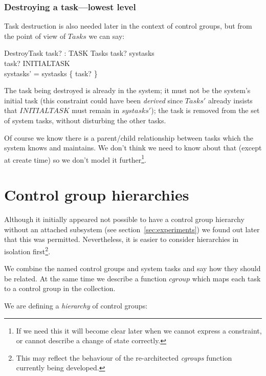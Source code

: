 \documentclass[a4paper,twoside,12pt]{article}
\begin{document}
\subsubsection{Destroying a task---lowest level}

Task destruction is also needed later in the context of control groups, but from the point of view of $Tasks$ we can say:

\begin{schema}{DestroyTask}
task? : TASK
\also
\Delta Tasks
\where
task? \in systasks \\
task? \neq INITIALTASK \\
systasks'  = systasks \setminus \{ task? \}
\end{schema}
The task being destroyed is already in the system; it must not be the system's initial task
(this constraint could have been \emph{derived} since $Tasks'$ already insists that $INITIALTASK$
must remain in $systasks'$);
the task is removed from the set of system tasks, without disturbing the other tasks.

Of course we know there is a parent/child relationship between tasks which the system knows and maintains.
We don't think we need to know about that (except at create time) so we don't model
it further\footnote{If we need this it will become clear later when we cannot express a constraint,
or cannot describe a change of state correctly.}.

\section{Control group hierarchies}
\label{sec:cgh}

Although it initially appeared not possible to have a control group hierarchy without an attached subsystem
(see section~\ref{sec:experiments}) we found out later that this was permitted.  
Nevertheless, it is easier to consider hierarchies in isolation 
first\footnote{This may reflect the behaviour of the re-architected \emph{cgroups} function currently being developed.}.

We combine the named control groups and system tasks and say how they should be related.
At the same time we describe a function $cgroup$ which maps each task to a control group in the collection.

We are defining a \emph{hierarchy} of control groups:
\end{document}
